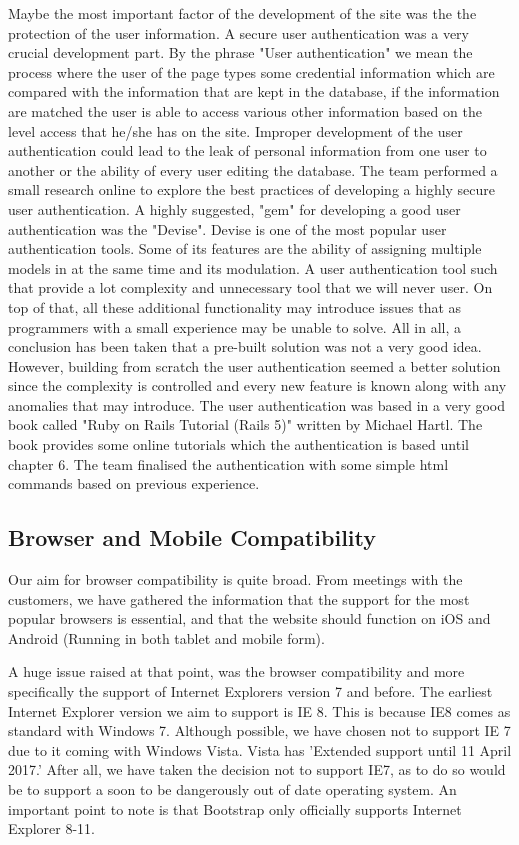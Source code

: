 \documentclass{l3proj}
\begin{document}
Maybe the most important factor of the development of the site was the the protection of the user information.  A secure user authentication was a very crucial development part. By the phrase "User authentication" we mean the process where the user of the page types some credential information which are compared with the information that are kept in the database, if the information are matched the user is able to access various other information based on the level access that he/she has on the site. Improper development of the user authentication could lead to the leak of personal information from one user to another or the ability of every user editing the database. The team performed a small research online to explore the best practices of developing a highly secure user authentication. A highly suggested, "gem" for developing a good user authentication was the "Devise". Devise is one of the most popular user authentication tools. Some of its features are the ability of assigning multiple models in at the same time and its modulation. A user authentication tool such that provide a lot complexity and unnecessary tool that we will never user. On top of that, all these additional functionality may introduce issues that as programmers with a small experience may be unable to solve. All in all, a conclusion has been taken that a pre-built solution was not a very good idea. However, building from scratch the user authentication seemed a better solution since the complexity is controlled and every new feature is known along with any anomalies that may introduce. The user authentication was based in a very good book called "Ruby on Rails Tutorial (Rails 5)" written by Michael Hartl. The book provides some online tutorials which the authentication is based until chapter 6. The team finalised the authentication with some simple html commands based on previous experience.


\subsection{Browser and Mobile Compatibility}
\label{sec:compatibility} 

Our aim for browser compatibility is quite broad. From meetings with the customers, we have gathered the information that the support for the most popular browsers is essential, and that the website should function on iOS and Android (Running in both tablet and mobile form).

 A huge issue raised at that point, was the browser compatibility and more specifically the support of Internet Explorers version 7 and before. The earliest Internet Explorer version we aim to support is IE 8. This is because IE8 comes as standard with Windows 7. Although possible, we have chosen not to support IE 7 due to it coming with Windows Vista. Vista has 'Extended support until 11 April 2017.' After all, we have taken the decision not to support IE7, as to do so would be to support a soon to be dangerously out of date operating system. An important point to note is that Bootstrap only officially supports Internet Explorer 8-11.
 
\end{document}
